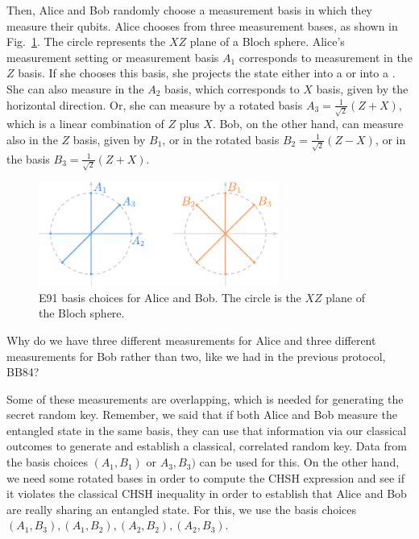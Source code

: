 Then, Alice and Bob randomly choose a measurement basis in which they measure their qubits. Alice chooses from three measurement bases, as shown in Fig.~\ref{fig:e91-bases}. The circle represents the $XZ$ plane of a Bloch sphere. Alice's measurement setting or measurement basis $A_1$ corresponds to measurement in the $Z$ basis. If she chooses this basis, she projects the state either into a  or into a . She can also measure in the $A_2$ basis, which corresponds to $X$ basis, given by the horizontal direction. Or, she can measure by a rotated basis $A_3=\frac{1}{\sqrt{2}}(Z+X)$, which is a linear combination of $Z$ plus $X$. Bob, on the other hand, can measure also in the $Z$ basis, given by $B_1$, or in the rotated basis $B_2 = \frac{1}{\sqrt{2}}(Z-X)$, or in the basis $B_3=\frac{1}{\sqrt{2}}(Z+X)$.

\begin{figure}[H]
    \centering
    \includegraphics[width=0.7\textwidth]{lesson10/10-3_bases.pdf}
        \caption{E91 basis choices for Alice and Bob.  The circle is the $XZ$ plane of the Bloch sphere.}
    \label{fig:e91-bases}
\end{figure}

Why do we have three different measurements for Alice and three different measurements for Bob rather than two, like we had in the previous protocol, BB84?

Some of these measurements are overlapping, which is needed for generating the secret random key. Remember, we said that if both Alice and Bob measure the entangled state in the same basis, they can use that information via our classical outcomes to generate and establish a classical, correlated random key. Data from the basis choices $(A_1, B_1)$ or $A_3,B_3)$ can be used for this. On the other hand, we need some rotated bases in order to compute the CHSH expression and see if it violates the classical CHSH inequality in order to establish that Alice and Bob are really sharing an entangled state. For this, we use the basis choices $(A_1,B_3), (A_1,B_2), (A_2,B_2), (A_2,B_3)$.

